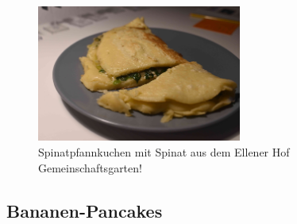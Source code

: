 \documentclass[a4paper, 12pt]{scrbook} 								%
\numberwithin{equation}{section} 									%
\begin{document}
		\begin{figure}[h]
			\centering
			\includegraphics[width = 0.6\textwidth]{media/spinat_pfannkuchen.JPG}
			\caption{Spinatpfannkuchen mit Spinat aus dem Ellener Hof Gemeinschaftsgarten!}
		\end{figure}

		\newpage


		\subsection{Bananen-Pancakes}	\label{Bananen-Pancakes}
\end{document}
